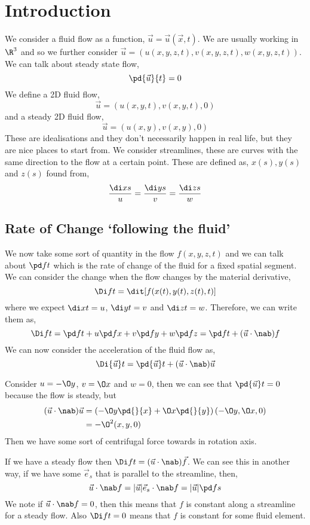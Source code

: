 
\section{Introduction}

We consider a fluid flow as a function, $\vec u = \vec u(\vec x, t)$. We are usually working in $\R^3$ and so we further consider $\vec u = (u(x, y, z, t), v(x, y, z, t), w(x, y, z, t))$. We can talk about steady state flow,
$$ \pd{\vec{u}}{t} = 0 $$
We define a 2D fluid flow,
$$ \vec u = (u(x, y, t), v(x, y, t), 0) $$
and a steady 2D fluid flow,
$$ \vec u = (u(x, y), v(x, y), 0) $$
These are idealisations and they don't necessarily happen in real life, but they are nice places to start from. We consider streamlines, these are curves with the same direction to the flow at a certain point. These are defined as, $x(s), y(s)$ and $z(s)$ found from,
$$ \frac{\di x s}{u} = \frac{\di y s}{v} = \frac{\di z s}{w} $$

\subsection{Rate of Change `following the fluid'}
We now take some sort of quantity in the flow $f(x, y, z, t)$ and we can talk about $\pd f t$ which is the rate of change of the fluid for a fixed spatial segment. We can consider the change when the flow changes by the material derivative,
$$ \Di f t = \dit [f(x(t), y(t), z(t), t)] $$
where we expect $\di x t = u$, $\di y t = v$ and $\di z t = w$. Therefore, we can write them as,
$$ \Di f t = \pd f t + u\pd f x + v\pd f y + w\pd f z = \pd f t + (\vec u \cdot \nab) f $$
We can now consider the acceleration of the fluid flow as,
$$ \Di {\vec u} t = \pd {\vec u} t + (\vec u \cdot \nab)\vec u $$

\begin{eg}
  Consider $u = -\O y$, $v = \O x$ and $w = 0$, then we can see that $\pd {\vec u} t = 0$ because the flow is steady, but
  \begin{align*}
    (\vec u \cdot \nab)\vec u &= \left( -\O y \pd{}{x} + \O x\pd{}{y} \right)(-\O y, \O x, 0)\\
    &= -\O^2 (x, y, 0)
  \end{align*}
  Then we have some sort of centrifugal force towards in rotation axis.
\end{eg}

\noindent
If we have a steady flow then $\Di f t = (\vec u \cdot \nab) \vec f$. We can see this in another way, if we have some $\vec e_s$ that is parallel to the streamline, then,
$$ \vec u \cdot \nab f = |\vec u|\vec e_s \cdot \nab f = |\vec u|\pd f s $$
We note if $\vec u \cdot \nab f = 0$, then this means that $f$ is constant along a streamline for a steady flow. Also $\Di f t = 0$ means that $f$ is constant for some fluid element.

